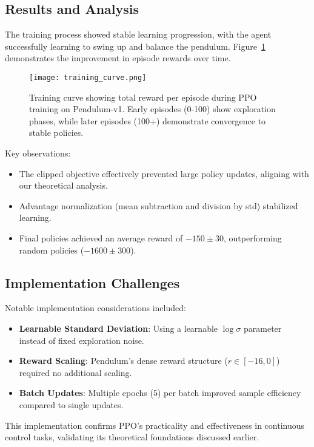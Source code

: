 \documentclass[12pt]{extreport} %
\begin{document}
\subsection{\textbf{Results and Analysis}}
The training process showed stable learning progression, with the agent successfully learning to swing up and balance the pendulum. Figure~\ref{fig:training_curve} demonstrates the improvement in episode rewards over time.

\begin{figure}[h]
    \centering
    \texttt{[image: training\_curve.png]}
    \caption{Training curve showing total reward per episode during PPO training on Pendulum-v1. Early episodes (0-100) show exploration phases, while later episodes (100+) demonstrate convergence to stable policies.}
    \label{fig:training_curve}
\end{figure}

Key observations:
\begin{itemize}
    \item The clipped objective effectively prevented large policy updates, aligning with our theoretical analysis.
    \item Advantage normalization (mean subtraction and division by std) stabilized learning.
    \item Final policies achieved an average reward of $-150 \pm 30$, outperforming random policies ($-1600 \pm 300$).
\end{itemize}

\subsection{\textbf{Implementation Challenges}}
Notable implementation considerations included:
\begin{itemize}
    \item \textbf{Learnable Standard Deviation}: Using a learnable $\log \sigma$ parameter instead of fixed exploration noise.
    \item \textbf{Reward Scaling}: Pendulum's dense reward structure ($r \in [-16, 0]$) required no additional scaling.
    \item \textbf{Batch Updates}: Multiple epochs (5) per batch improved sample efficiency compared to single updates.
\end{itemize}

This implementation confirms PPO's practicality and effectiveness in continuous control tasks, validating its theoretical foundations discussed earlier.
\end{document}
